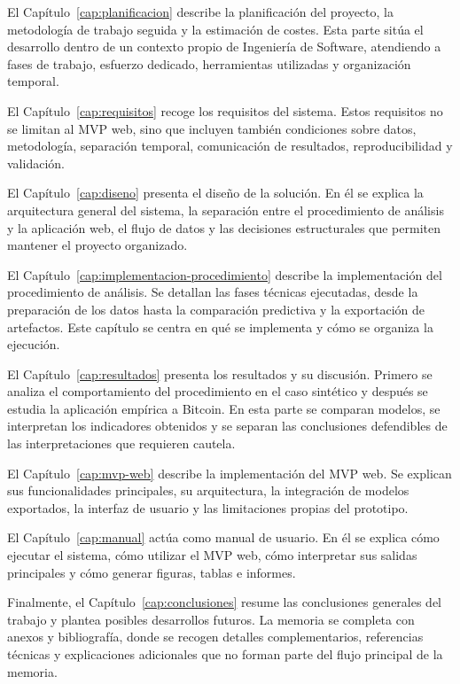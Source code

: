 El Capítulo~\ref{cap:planificacion} describe la planificación del proyecto, la metodología de trabajo seguida y la estimación de costes. Esta parte sitúa el desarrollo dentro de un contexto propio de Ingeniería de Software, atendiendo a fases de trabajo, esfuerzo dedicado, herramientas utilizadas y organización temporal.

El Capítulo~\ref{cap:requisitos} recoge los requisitos del sistema. Estos requisitos no se limitan al MVP web, sino que incluyen también condiciones sobre datos, metodología, separación temporal, comunicación de resultados, reproducibilidad y validación.

El Capítulo~\ref{cap:diseno} presenta el diseño de la solución. En él se explica la arquitectura general del sistema, la separación entre el procedimiento de análisis y la aplicación web, el flujo de datos y las decisiones estructurales que permiten mantener el proyecto organizado.

El Capítulo~\ref{cap:implementacion-procedimiento} describe la implementación del procedimiento de análisis. Se detallan las fases técnicas ejecutadas, desde la preparación de los datos hasta la comparación predictiva y la exportación de artefactos. Este capítulo se centra en qué se implementa y cómo se organiza la ejecución.

El Capítulo~\ref{cap:resultados} presenta los resultados y su discusión. Primero se analiza el comportamiento del procedimiento en el caso sintético y después se estudia la aplicación empírica a Bitcoin. En esta parte se comparan modelos, se interpretan los indicadores obtenidos y se separan las conclusiones defendibles de las interpretaciones que requieren cautela.

El Capítulo~\ref{cap:mvp-web} describe la implementación del MVP web. Se explican sus funcionalidades principales, su arquitectura, la integración de modelos exportados, la interfaz de usuario y las limitaciones propias del prototipo.

El Capítulo~\ref{cap:manual} actúa como manual de usuario. En él se explica cómo ejecutar el sistema, cómo utilizar el MVP web, cómo interpretar sus salidas principales y cómo generar figuras, tablas e informes.

Finalmente, el Capítulo~\ref{cap:conclusiones} resume las conclusiones generales del trabajo y plantea posibles desarrollos futuros. La memoria se completa con anexos y bibliografía, donde se recogen detalles complementarios, referencias técnicas y explicaciones adicionales que no forman parte del flujo principal de la memoria.
